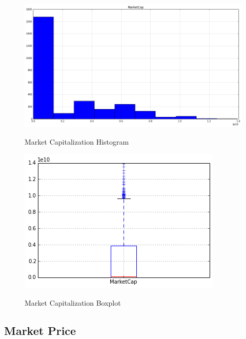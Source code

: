 \begin{figure}[bth]
  \myfloatalign
  {\includegraphics[width=1\linewidth]
    {gfx/market-cap-histogram}}
  \caption{Market Capitalization Histogram}
  \label{fig:market-cap-histogram}
\end{figure}

\begin{figure}[bth]
  \myfloatalign
  {\includegraphics[width=1\linewidth]
    {gfx/market-cap-boxplot}}
  \caption{Market Capitalization Boxplot}
  \label{fig:market-cap-boxplot}
\end{figure}

\clearpage

\subsection{Market Price}
\label{sec:market-price}

